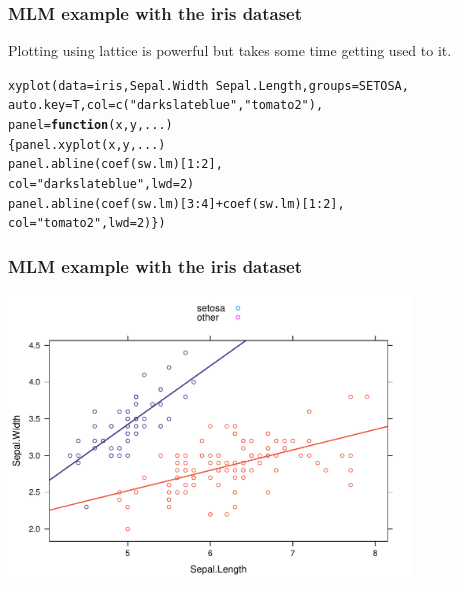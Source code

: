 \documentclass[xcolor=table, xcolor=dvipsnames]{beamer}\usepackage[]{graphicx}\usepackage[]{color}
\makeatletter
\newcommand{\hlnum}[1]{\textcolor[rgb]{0,0,0}{#1}}
\newcommand{\hlstr}[1]{\textcolor[rgb]{0.545,0.137,0.137}{#1}}
\newcommand{\hlopt}[1]{\textcolor[rgb]{0,0,0}{#1}}
\newcommand{\hlstd}[1]{\textcolor[rgb]{0,0,0}{#1}}
\newcommand{\hlkwa}[1]{\textcolor[rgb]{1,0,0}{\textbf{#1}}}
\newcommand{\hlkwc}[1]{\textcolor[rgb]{1,0,1}{#1}}
\newcommand{\hlkwd}[1]{\textcolor[rgb]{0,0,1}{#1}}
\newenvironment{kframe}{%
 \def\at@end@of@kframe{}%
 \ifinner\ifhmode%
  \def\at@end@of@kframe{\end{minipage}}%
  \begin{minipage}{\columnwidth}%
 \fi\fi%
 \def\FrameCommand##1{\hskip\@totalleftmargin \hskip-\fboxsep
 \colorbox{shadecolor}{##1}\hskip-\fboxsep
     \hskip-\linewidth \hskip-\@totalleftmargin \hskip\columnwidth}%
 \MakeFramed {\advance\hsize-\width
   \@totalleftmargin\z@ \linewidth\hsize
   \@setminipage}}%
 {\par\unskip\endMakeFramed%
 \at@end@of@kframe}
\newenvironment{knitrout}{}{} %
\makeatother
\begin{document}
\begin{frame}[fragile]\frametitle{MLM example with the iris dataset}
Plotting using lattice is powerful but takes some time getting used to it.
\begin{knitrout}\small
{}\color{fgcolor}\begin{kframe}
\begin{alltt}
\hlkwd{xyplot}\hlstd{(}\hlkwc{data}\hlstd{=iris, Sepal.Width} \hlopt{~} \hlstd{Sepal.Length,} \hlkwc{groups}\hlstd{=SETOSA,}
       \hlkwc{auto.key}\hlstd{=T,} \hlkwc{col}\hlstd{=}\hlkwd{c}\hlstd{(}\hlstr{"darkslateblue"}\hlstd{,} \hlstr{"tomato2"}\hlstd{),}
        \hlkwc{panel}\hlstd{=}\hlkwa{function}\hlstd{(}\hlkwc{x}\hlstd{,}\hlkwc{y}\hlstd{,}\hlkwc{...}\hlstd{)}
          \hlstd{\{}\hlkwd{panel.xyplot}\hlstd{(x,y,...)}
          \hlkwd{panel.abline}\hlstd{(}\hlkwd{coef}\hlstd{(sw.lm)[}\hlnum{1}\hlopt{:}\hlnum{2}\hlstd{],}
                       \hlkwc{col}\hlstd{=}\hlstr{"darkslateblue"}\hlstd{,} \hlkwc{lwd}\hlstd{=}\hlnum{2}\hlstd{)}
          \hlkwd{panel.abline}\hlstd{(}\hlkwd{coef}\hlstd{(sw.lm)[}\hlnum{3}\hlopt{:}\hlnum{4}\hlstd{]} \hlopt{+} \hlkwd{coef}\hlstd{(sw.lm)[}\hlnum{1}\hlopt{:}\hlnum{2}\hlstd{],}
                       \hlkwc{col}\hlstd{=}\hlstr{"tomato2"}\hlstd{,} \hlkwc{lwd}\hlstd{=}\hlnum{2}\hlstd{)\})}
\end{alltt}
\end{kframe}
\end{knitrout}
\end{frame}





\begin{frame}[fragile]\frametitle{MLM example with the iris dataset}
\begin{center}
\includegraphics[width=0.8\textwidth]{./externalfig/sepalwidth_ancovaplot.pdf}
\end{center}
\end{frame}
\end{document}
